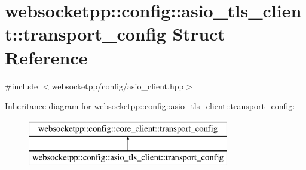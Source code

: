 \hypertarget{structwebsocketpp_1_1config_1_1asio__tls__client_1_1transport__config}{}\section{websocketpp\+:\+:config\+:\+:asio\+\_\+tls\+\_\+client\+:\+:transport\+\_\+config Struct Reference}
\label{structwebsocketpp_1_1config_1_1asio__tls__client_1_1transport__config}


{\ttfamily \#include $<$websocketpp/config/asio\+\_\+client.\+hpp$>$}

Inheritance diagram for websocketpp\+:\+:config\+:\+:asio\+\_\+tls\+\_\+client\+:\+:transport\+\_\+config\+:\begin{figure}[H]
\begin{center}
\leavevmode
\includegraphics[height=2.000000cm]{structwebsocketpp_1_1config_1_1asio__tls__client_1_1transport__config}
\end{center}
\end{figure}
